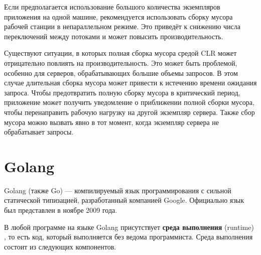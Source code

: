 Если предполагается использование большого количества экземпляров приложения на одной машине, рекомендуется использовать сборку мусора рабочей станции в непараллельном режиме. Это приведёт к снижению числа переключений между потоками и может повысить производительность. \cite{dotnet_gc_types}

Существуют ситуации, в которых полная сборка мусора средой CLR может отрицательно повлиять на производительность. Это может быть проблемой, особенно для серверов, обрабатывающих большие объемы запросов. В этом случае длительная сборка мусора может привести к истечению времени ожидания запроса. Чтобы предотвратить полную сборку мусора в критический период, приложение может получить уведомление о приближении полной сборки мусора, чтобы перенаправить рабочую нагрузку на другой экземпляр сервера. Также сбор мусора можно вызвать явно в тот момент, когда экземпляр сервера не обрабатывает запросы. \cite{dotnet_gc_notifications}



%
%
%
%
%
%
%
%
%
%
%
%





\section{Golang}

Golang (также Go) \cite{golang} --- компилируемый язык программирования с сильной статической типизацией, разработанный компанией Google. Официально язык был представлен в ноябре 2009 года.

В любой программе на языке Golang присутствует \textbf{среда выполнения} (runtime) \cite{golang_runtime}, то есть код, который выполняется без ведома программиста. Среда выполнения состоит из следующих компонентов.


